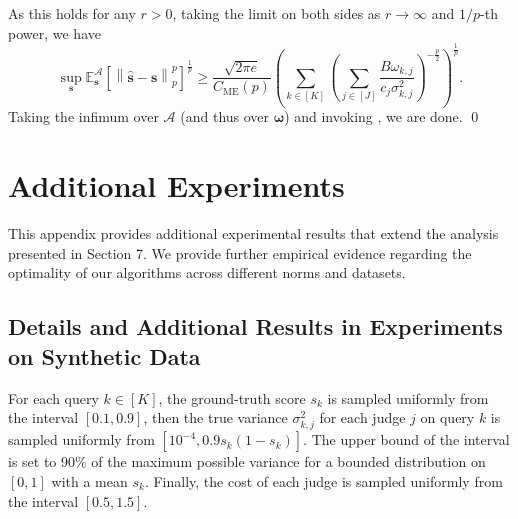 \documentclass{article}
\def\vs{{\bm{s}}}
\def\gA{{\mathcal{A}}}
\newcommand{\E}{\mathbb{E}}
\theoremstyle{plain}
\theoremstyle{definition}
\theoremstyle{plain}
\newcommand{\bignorm}[1]{\left\lVert #1 \right\rVert}
\begin{document}
As this holds for any $r > 0$, taking the limit on both sides as $r \rightarrow \infty$ and $1/p$-th power, we have
\begin{equation}
    \sup_{\vs} \E^\gA_{\vs}\left[ \bignorm{\hat{\vs} - \vs}_p^p \right]^{\frac{1}{p}} \geq \frac{\sqrt{2 \pi e}}{C_{\mathrm{ME}}(p)} \left( \sum_{k \in [K]} \left( \sum_{j \in [J]} \frac{B \omega_{k,j}}{c_j \sigma_{k,j}^2} \right)^{-\frac{p}{2}} \right)^{\frac{1}{p}}.
\end{equation}
Taking the infimum over $\gA$ (and thus over $\bm\omega$) and invoking , we are done.
\qed

\newpage
\section{Additional Experiments}\label{app:experiments}
This appendix provides additional experimental results that extend the analysis presented in Section 7. We provide further empirical evidence regarding the optimality of our algorithms across different norms and datasets.

\subsection{Details and Additional Results in Experiments on Synthetic Data}\label{app:synthetic_data_extended}

For each query $k \in [K]$, the ground-truth score $s_k$ is sampled uniformly from the interval $[0.1, 0.9]$, then the true variance $\sigma_{k,j}^2$ for each judge $j$ on query $k$ is sampled uniformly from $[10^{-4}, 0.9 s_k(1-s_k)]$. The upper bound of the interval is set to 90\% of the maximum possible variance for a bounded distribution on $[0,1]$ with a mean $s_k$.
Finally, the cost of each judge is sampled uniformly from the interval $[0.5, 1.5]$.
\end{document}
